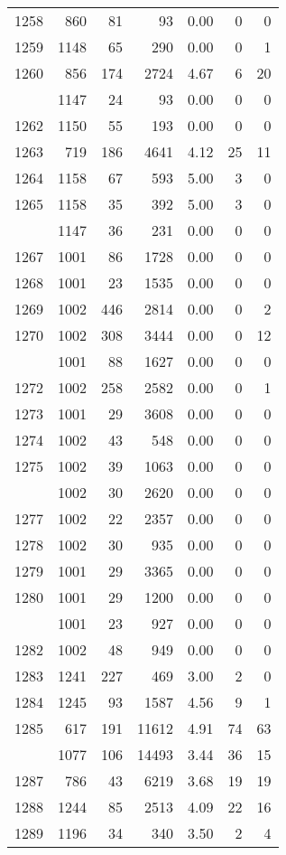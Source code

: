 \documentclass[
]{article}
\begin{document}
\begin{table}
\begin{tabular}[t]{lrrrrrr}
1258 & 860 & 81 & 93 & 0.00 & 0 & 0\\
1259 & 1148 & 65 & 290 & 0.00 & 0 & 1\\
1260 & 856 & 174 & 2724 & 4.67 & 6 & 20\\
\addlinespace
1261 & 1147 & 24 & 93 & 0.00 & 0 & 0\\
1262 & 1150 & 55 & 193 & 0.00 & 0 & 0\\
1263 & 719 & 186 & 4641 & 4.12 & 25 & 11\\
1264 & 1158 & 67 & 593 & 5.00 & 3 & 0\\
1265 & 1158 & 35 & 392 & 5.00 & 3 & 0\\
\addlinespace
1266 & 1147 & 36 & 231 & 0.00 & 0 & 0\\
1267 & 1001 & 86 & 1728 & 0.00 & 0 & 0\\
1268 & 1001 & 23 & 1535 & 0.00 & 0 & 0\\
1269 & 1002 & 446 & 2814 & 0.00 & 0 & 2\\
1270 & 1002 & 308 & 3444 & 0.00 & 0 & 12\\
\addlinespace
1271 & 1001 & 88 & 1627 & 0.00 & 0 & 0\\
1272 & 1002 & 258 & 2582 & 0.00 & 0 & 1\\
1273 & 1001 & 29 & 3608 & 0.00 & 0 & 0\\
1274 & 1002 & 43 & 548 & 0.00 & 0 & 0\\
1275 & 1002 & 39 & 1063 & 0.00 & 0 & 0\\
\addlinespace
1276 & 1002 & 30 & 2620 & 0.00 & 0 & 0\\
1277 & 1002 & 22 & 2357 & 0.00 & 0 & 0\\
1278 & 1002 & 30 & 935 & 0.00 & 0 & 0\\
1279 & 1001 & 29 & 3365 & 0.00 & 0 & 0\\
1280 & 1001 & 29 & 1200 & 0.00 & 0 & 0\\
\addlinespace
1281 & 1001 & 23 & 927 & 0.00 & 0 & 0\\
1282 & 1002 & 48 & 949 & 0.00 & 0 & 0\\
1283 & 1241 & 227 & 469 & 3.00 & 2 & 0\\
1284 & 1245 & 93 & 1587 & 4.56 & 9 & 1\\
1285 & 617 & 191 & 11612 & 4.91 & 74 & 63\\
\addlinespace
1286 & 1077 & 106 & 14493 & 3.44 & 36 & 15\\
1287 & 786 & 43 & 6219 & 3.68 & 19 & 19\\
1288 & 1244 & 85 & 2513 & 4.09 & 22 & 16\\
1289 & 1196 & 34 & 340 & 3.50 & 2 & 4\\

\end{tabular}
\end{table}
\end{document}
